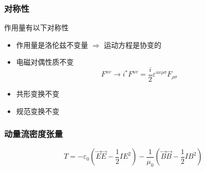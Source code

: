 \documentclass[UTF8]{ctexart}
\begin{document}
    \subsubsection{对称性}
    作用量有以下对称性
    \begin{itemize}
        \item 作用量是洛伦兹不变量 $\Rightarrow$ 运动方程是协变的
        \item 电磁对偶性质不变
        \begin{equation}
            F^{uv} \rightarrow i^{*} F^{uv} = \frac{i}{2}\varepsilon^{uv\rho \sigma}F_{\rho \sigma}
        \end{equation}
        \item 共形变换不变
        \item 规范变换不变
    \end{itemize}

    \subsubsection{动量流密度张量}
    \begin{equation}
       T = - \varepsilon_0 \left(\vec{E} \vec{E} - \frac{1}{2} I E^2\right) - \frac{1}{\mu_0}\left(\vec{B}\vec{B} - \frac{1}{2} I B^2\right)
    \end{equation}
\end{document}
